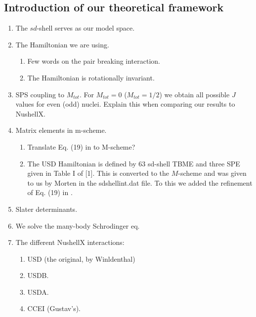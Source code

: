 \documentclass[aps,prl,reprint,groupedaddress]{revtex4-1}  %
\begin{document}
\subsection{Introduction of our theoretical framework}
\begin{enumerate}
	\item The $sd$-shell serves as our model space.
	\item The Hamiltonian we are using.
	\begin{enumerate}
		\item Few words on the pair breaking interaction.
		\item The Hamiltonian is rotationally invariant.
	\end{enumerate}
	\item SPS coupling to $M_{tot}$. For $M_{tot}=0$ ($M_{tot}=1/2$)  we obtain all possible $J$ values for even (odd) nuclei. Explain this when comparing our results to NushellX.
	\item Matrix elements in m-scheme. 
	\begin{enumerate}
		\item Translate Eq. (19) in \cite{Brown2006} to M-scheme? 
		\item The USD Hamiltonian is defined by 63 sd-shell TBME and three SPE given in Table I of [1]. This is converted to the $M$-scheme and was given to us by Morten in the sdshellint.dat file. To this we added the refinement of Eq. (19) in \cite{Brown2006}.
	\end{enumerate}
	\item Slater determinants.
	\item We solve the many-body Schrodinger eq.
	\item The different NushellX interactions:
	\begin{enumerate}
		\item USD (the original, by Winldenthal)
		\item USDB.
		\item USDA.
		\item CCEI (Gustav's).
	\end{enumerate}
\end{enumerate}



\end{document}
